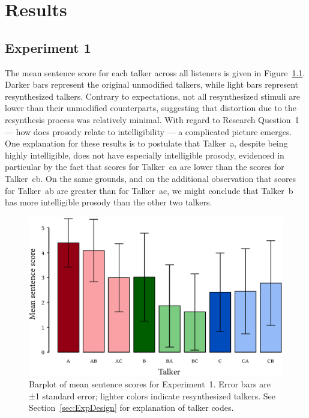 \chapter{Results}

\section{Experiment 1}
The mean sentence score for each talker across all listeners is given in Figure~\ref{fig:ExpOneBarplot}.  Darker bars represent the original unmodified talkers, while light bars represent resynthesized talkers.  Contrary to expectations, not all resynthesized stimuli are lower than their unmodified counterparts, suggesting that distortion due to the resynthesis process was relatively minimal.  With regard to Research Question~1 — how does prosody relate to intelligibility — a complicated picture emerges.  One explanation for these results is to postulate that Talker~\ac{a}, despite being highly intelligible, does not have especially intelligible prosody, evidenced in particular by the fact that scores for Talker~\ac{ca} are lower than the scores for Talker~\ac{cb}.  On the same grounds, and on the additional observation that scores for Talker~\ac{ab} are greater than for Talker~\ac{ac}, we might conclude that Talker~\ac{b} has more intelligible prosody than the other two talkers.

\begin{figure}[htbp]
	\begin{centering}
	\includegraphics{figures/results/ExpOneBarplot.eps}
	\caption[Barplot of mean sentence scores for Experiment~1]{Barplot of mean sentence scores for Experiment~1.  Error bars are ±1 standard error; lighter colors indicate resynthesized talkers.  See Section~\ref{sec:ExpDesign} for explanation of talker codes.\label{fig:ExpOneBarplot}}
	\end{centering}
\end{figure}

